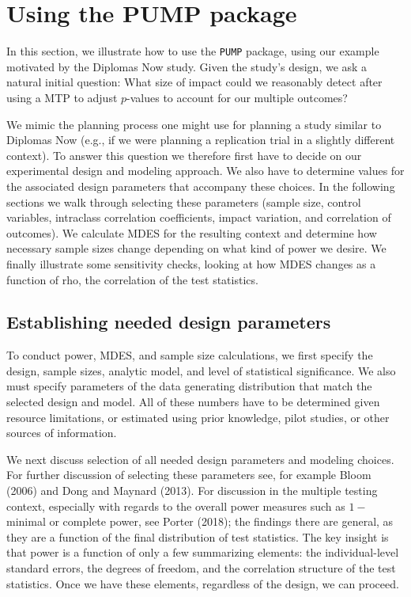 \documentclass{article}
\begin{document}
\section{Using the PUMP package}
\label{sec:vignette}

In this section, we illustrate how to use the \texttt{PUMP} package,
using our example motivated by the Diplomas Now study. Given the study's
design, we ask a natural initial question: What size of impact could we
reasonably detect after using a MTP to adjust \(p\)-values to account
for our multiple outcomes?

We mimic the planning process one might use for planning a study similar
to Diplomas Now (e.g., if we were planning a replication trial in a
slightly different context). To answer this question we therefore first
have to decide on our experimental design and modeling approach. We also
have to determine values for the associated design parameters that
accompany these choices. In the following sections we walk through
selecting these parameters (sample size, control variables, intraclass
correlation coefficients, impact variation, and correlation of
outcomes). We calculate MDES for the resulting context and determine how
necessary sample sizes change depending on what kind of power we desire.
We finally illustrate some sensitivity checks, looking at how MDES
changes as a function of rho, the correlation of the test statistics.

\subsection{Establishing needed design parameters}

To conduct power, MDES, and sample size calculations, we first specify
the design, sample sizes, analytic model, and level of statistical
significance. We also must specify parameters of the data generating
distribution that match the selected design and model. All of these
numbers have to be determined given resource limitations, or estimated
using prior knowledge, pilot studies, or other sources of information.

We next discuss selection of all needed design parameters and modeling
choices. For further discussion of selecting these parameters see, for
example Bloom (2006) and Dong and Maynard (2013). For discussion in the
multiple testing context, especially with regards to the overall power
measures such as \(1-\)minimal or complete power, see Porter (2018); the
findings there are general, as they are a function of the final
distribution of test statistics. The key insight is that power is a
function of only a few summarizing elements: the individual-level
standard errors, the degrees of freedom, and the correlation structure
of the test statistics. Once we have these elements, regardless of the
design, we can proceed.
\end{document}
